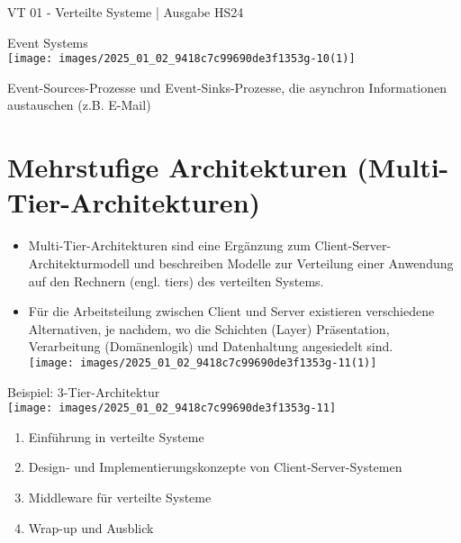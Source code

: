 \documentclass[10pt]{article}
\begin{document}
VT 01 - Verteilte Systeme | Ausgabe HS24

Event Systems\\
\texttt{[image: images/2025\_01\_02\_9418c7c99690de3f1353g-10(1)]}

Event-Sources-Prozesse und Event-Sinks-Prozesse, die asynchron Informationen austauschen (z.B. E-Mail)

\section*{Mehrstufige Architekturen (Multi-Tier-Architekturen)}
\begin{itemize}
  \item Multi-Tier-Architekturen sind eine Ergänzung zum Client-Server-Architekturmodell und beschreiben Modelle zur Verteilung einer Anwendung auf den Rechnern (engl. tiers) des verteilten Systems.
  \item Für die Arbeitsteilung zwischen Client und Server existieren verschiedene Alternativen, je nachdem, wo die Schichten (Layer) Präsentation, Verarbeitung (Domänenlogik) und Datenhaltung angesiedelt sind.\\
\texttt{[image: images/2025\_01\_02\_9418c7c99690de3f1353g-11(1)]}
\end{itemize}

Beispiel: 3-Tier-Architektur\\
\texttt{[image: images/2025\_01\_02\_9418c7c99690de3f1353g-11]}

\begin{enumerate}
  \item Einführung in verteilte Systeme
  \item Design- und Implementierungskonzepte von Client-Server-Systemen
  \item Middleware für verteilte Systeme
  \item Wrap-up und Ausblick
\end{enumerate}
\end{document}
